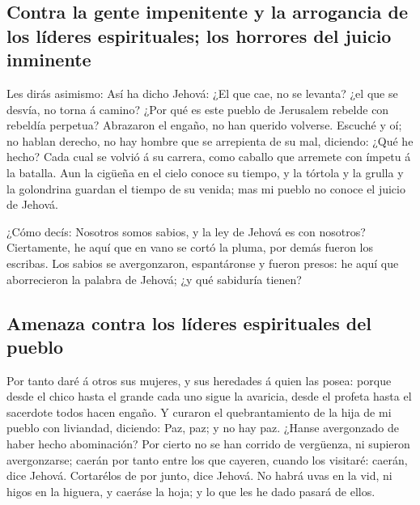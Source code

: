 \hypertarget{contra-la-gente-impenitente-y-la-arrogancia-de-los-luxedderes-espirituales-los-horrores-del-juicio-inminente}{%
\subsection{Contra la gente impenitente y la arrogancia de los líderes
espirituales; los horrores del juicio
inminente}\label{contra-la-gente-impenitente-y-la-arrogancia-de-los-luxedderes-espirituales-los-horrores-del-juicio-inminente}}

 Les dirás asimismo: Así ha dicho Jehová: ¿El que cae, no
se levanta? ¿el que se desvía, no torna á camino?  ¿Por
qué es este pueblo de Jerusalem rebelde con rebeldía perpetua? Abrazaron
el engaño, no han querido volverse.  Escuché y oí; no
hablan derecho, no hay hombre que se arrepienta de su mal, diciendo:
¿Qué he hecho? Cada cual se volvió á su carrera, como caballo que
arremete con ímpetu á la batalla.  Aun la cigüeña en el
cielo conoce su tiempo, y la tórtola y la grulla y la golondrina guardan
el tiempo de su venida; mas mi pueblo no conoce el juicio de Jehová.

 ¿Cómo decís: Nosotros somos sabios, y la ley de Jehová es
con nosotros? Ciertamente, he aquí que en vano se cortó la pluma, por
demás fueron los escribas.  Los sabios se avergonzaron,
espantáronse y fueron presos: he aquí que aborrecieron la palabra de
Jehová; ¿y qué sabiduría tienen?

\hypertarget{amenaza-contra-los-luxedderes-espirituales-del-pueblo}{%
\subsection{Amenaza contra los líderes espirituales del
pueblo}\label{amenaza-contra-los-luxedderes-espirituales-del-pueblo}}

 Por tanto daré á otros sus mujeres, y sus heredades á
quien las posea: porque desde el chico hasta el grande cada uno sigue la
avaricia, desde el profeta hasta el sacerdote todos hacen engaño.
 Y curaron el quebrantamiento de la hija de mi pueblo con
liviandad, diciendo: Paz, paz; y no hay paz.  ¿Hanse
avergonzado de haber hecho abominación? Por cierto no se han corrido de
vergüenza, ni supieron avergonzarse; caerán por tanto entre los que
cayeren, cuando los visitaré: caerán, dice Jehová. 
Cortarélos de por junto, dice Jehová. No habrá uvas en la vid, ni higos
en la higuera, y caeráse la hoja; y lo que les he dado pasará de ellos.

